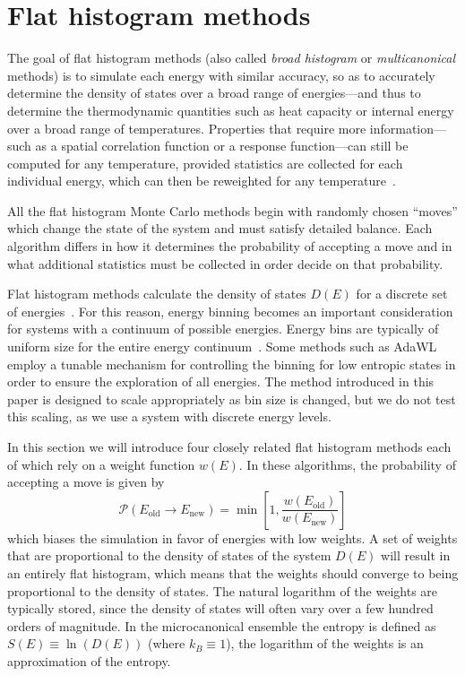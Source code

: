\documentclass[letterpaper,twocolumn,amsmath,amssymb,pre,aps,10pt]{revtex4-1}
\begin{document}
\section{Flat histogram methods}\label{sec:histogram}
The goal of flat histogram methods (also called \emph{broad histogram}
or \emph{multicanonical} methods) is to simulate each energy with
similar accuracy, so as to accurately determine the density of states
over a broad range of energies---and thus to determine the thermodynamic
quantities such as heat capacity or internal energy
over a broad range of temperatures.
Properties that require more information---such as a spatial
correlation function or a response function---can still be computed
for any temperature, provided statistics are collected for each
individual energy, which can then be reweighted for any
temperature~\cite{panagiotopoulos1998phase, panagiotopoulos2000monte,
errington2003direct}.

All the flat histogram Monte Carlo methods begin with randomly chosen
``moves'' which change the state of the system and must satisfy
detailed balance.  Each algorithm differs in how it determines the
probability of accepting a move and in what additional statistics must
be collected in order decide on that probability.

Flat histogram methods calculate the density of states $D(E)$ for a discrete set
of energies~\cite{wang2001determining, dayal2004performance, troyer2003flat,
trebst2004optimizing}. For this reason, energy binning becomes an important
consideration for systems with a continuum of possible energies.  Energy bins
are typically of uniform size for the entire energy
continuum~\cite{fasnacht2004adaptive}. Some methods such as
AdaWL~\cite{koh2013dynamically} employ a tunable mechanism for controlling the
binning for low entropic states in order to ensure the exploration of all
energies.  The method introduced in this paper is designed to scale
appropriately as bin size is changed, but we do not test this scaling, as we use
a system with discrete energy levels.

In this section we will introduce four closely related flat histogram
methods each of which rely on a weight function $w(E)$.  In these
algorithms, the probability of accepting a move is given by
\begin{equation}
	\mathcal{P}(E_\text{old} \rightarrow E_\text{new})
	= \min\left[1,\frac{w(E_\text{old})}{w(E_\text{new})}\right]
\end{equation}
which biases the simulation in favor of energies with low weights.  A set of
weights that are proportional to the density of states of the system $D(E)$ will
result in an entirely flat histogram, which means that the weights should
converge to being proportional to the density of states.  The natural logarithm
of the weights are typically stored, since the density of states will often vary
over a few hundred orders of magnitude. In the microcanonical ensemble the
entropy is defined as $S(E) \equiv \ln(D(E))$ (where $k_B \equiv 1$), the
logarithm of the weights is an approximation of the entropy.
\end{document}
